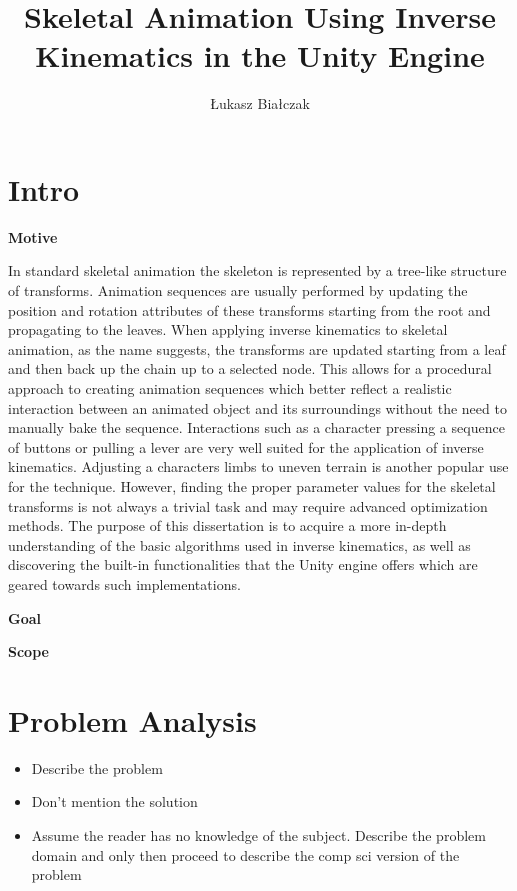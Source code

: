 \documentclass[a4paper, 12pt]{report} \linespread{1.3}
\title{Skeletal Animation Using Inverse Kinematics in the Unity Engine}
\author{Łukasz Białczak} \date{}
\begin{document}
\maketitle

\tableofcontents

\chapter{Intro}

\textbf{Motive}

In standard skeletal animation the skeleton is represented by a tree-like
structure of transforms. Animation sequences are usually performed by updating
the position and rotation attributes of these transforms starting from the root
and propagating to the leaves. When applying inverse kinematics to skeletal
animation, as the name suggests, the transforms are updated starting from a leaf
and then back up the chain up to a selected node. This allows for a procedural
approach to creating animation sequences which better reflect a realistic
interaction between an animated object and its surroundings without the need to
manually bake the sequence. Interactions such as a character pressing a sequence
of buttons or pulling a lever are very well suited for the application of inverse
kinematics. Adjusting a characters limbs to uneven terrain is another popular
use for the technique. However, finding the proper parameter values for the
skeletal transforms is not always a trivial task and may require advanced
optimization methods. The purpose of this dissertation is to acquire a more
in-depth understanding of the basic algorithms used in inverse kinematics, as
well as discovering the built-in functionalities that the Unity engine offers
which are geared towards such implementations.


\textbf{Goal}

\textbf{Scope}

\chapter{Problem Analysis}
\begin{itemize}
    \item Describe the problem
    \item Don't mention the solution
    \item Assume the reader has no knowledge of the subject. Describe the
        problem domain and only then proceed to describe the comp sci version of
        the problem
\end{itemize}
\end{document}
